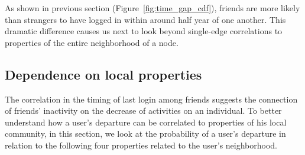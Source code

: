 \documentclass[phd,tocprelim]{cornell}
\renewcommand{\caption}[1]{\singlespacing\hangcaption{#1}\normalspacing}
\begin{document}

As shown in previous section (Figure~\ref{fig:time_gap_cdf}), friends are more likely than strangers to have logged in within around half year of
one another.  This dramatic difference causes us next to look beyond
single-edge correlations to properties of the entire neighborhood of a
node.

\subsection{Dependence on local properties}
The correlation in the timing of last login among friends suggests the connection of friends' inactivity on the decrease of activities on an individual. To better understand how a user's departure can be correlated to properties of his local community, in this section, we look at the probability of a user's departure in relation to the following four properties related to the user's neighborhood.
\end{document}
